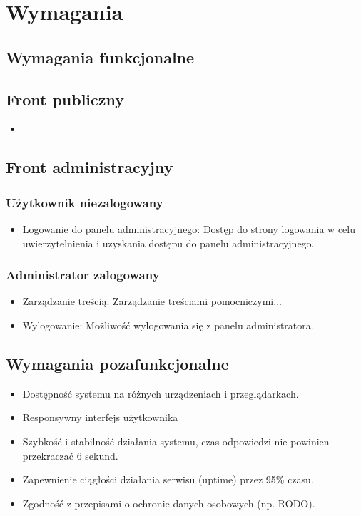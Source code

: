 {\let\clearpage\relax\chapter{Wymagania}}
\label{cha:Wymaganiafa}



\section{Wymagania funkcjonalne}

\section*{Front publiczny}

\begin{itemize}
    \item 
\end{itemize}

\section*{Front administracyjny}

\subsection*{Użytkownik niezalogowany}
\begin{itemize}
    \item Logowanie do panelu administracyjnego: Dostęp do strony logowania w celu uwierzytelnienia i uzyskania dostępu do panelu administracyjnego.
\end{itemize}

\subsection*{Administrator zalogowany}
\begin{itemize}
    \item Zarządzanie treścią: Zarządzanie treściami pomocniczymi...
    \item Wylogowanie: Możliwość wylogowania się z panelu administratora.
\end{itemize}

\section{Wymagania pozafunkcjonalne}

\begin{itemize}
    \item Dostępność systemu na różnych urządzeniach i przeglądarkach.
    \item Responsywny interfejs użytkownika
    \item Szybkość i stabilność działania systemu, czas odpowiedzi nie powinien przekraczać 6 sekund.
    \item Zapewnienie ciągłości działania serwisu (uptime) przez 95\% czasu.
    \item Zgodność z przepisami o ochronie danych osobowych (np. RODO).
\end{itemize}